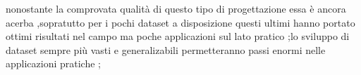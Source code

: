 nonostante la comprovata qualità di questo tipo di progettazione essa   è ancora acerba ,sopratutto per i pochi dataset a disposizione questi ultimi hanno portato ottimi risultati nel campo ma poche applicazioni sul lato pratico ;lo sviluppo di dataset sempre più vasti e generalizabili  permetteranno  passi enormi nelle applicazioni pratiche ;
